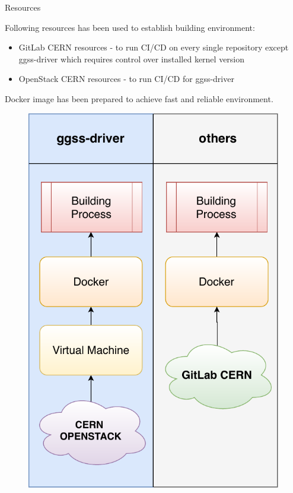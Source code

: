 \documentclass[10pt]{beamer}
\begin{document}
\begin{frame}{Resources}
\begin{minipage}{0.65\linewidth}
	Following resources has been used to establish building environment:
	\begin{itemize}
		\item GitLab CERN resources - to run CI/CD on every single repository except ggss-driver which requires control over installed kernel version
		\item OpenStack CERN resources - to run CI/CD for ggss-driver
	\end{itemize}
	Docker image has been prepared to achieve fast and reliable environment.
\end{minipage}
\begin{minipage}{0.32\linewidth}
	\begin{figure}
		\centering
		\includegraphics[width=\linewidth]{resources/buildComp}
	\end{figure}
\end{minipage}
\end{frame}
\end{document}
